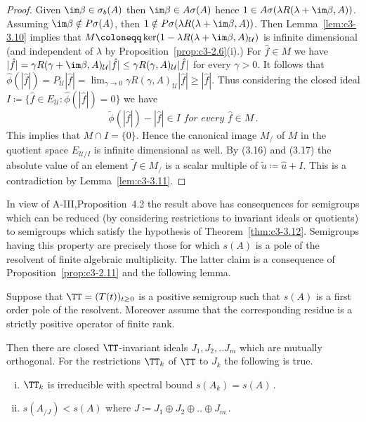 \begin{proof}
	Given $\im\beta \in \sigma_{b}(A)$ then $\im\beta \in A\sigma(A)$ hence $1 \in A\sigma(\lambda R(\lambda+\im\beta,A))$.
	Assuming $\im\beta \notin P\sigma(A)$, then $1 \notin P\sigma(\lambda R(\lambda+\im\beta,A))$.
	Then Lemma~\ref{lem:c3-3.10} implies that $M \coloneqq \ker(1 - \lambda R(\lambda+\im\beta,A)_{\mathcal{U}})$ is infinite dimensional (and independent of $\lambda$ by Proposition~\ref{prop:c3-2.6}(i).)
	For $\hat{f} \in M$ we have $|\hat{f}| = \gamma R(\gamma+\im\beta,A)_{\mathcal{U}}|\hat{f}| \leq \gamma R(\gamma,A)_{\mathcal{U}}|\hat{f}|$ for every $\gamma > 0$.
	It follows that $\hat{\phi}(|\hat{f}|) = P_{\mathcal{U}}|\hat{f}| = \lim_{\gamma\to 0}\gamma R(\gamma,A)_{\mathcal{U}}|\hat{f}| \geq |\hat{f}|$.
	Thus considering the closed ideal $I \coloneqq \{\hat{f} \in E_{\mathcal{U}} \colon \hat{\phi}(|\hat{f}|) = 0\}$ we have
%
%
	\begin{equation}\label{eq:c3-3.17}
		\tilde{\phi}(|\hat{f}|) - |\hat{f}| \in I \textit{ for every } \hat{f} \in M\,.
	\end{equation}
	This implies that $M \cap I = \{0\}$. 
	Hence the canonical image $M_/$ of $M$ in the quotient space $E_{\mathcal{U}/{I}}$ is infinite dimensional as well. 
	By (3.16) and (3.17) the absolute value of an element $\tilde{f} \in M_/$ is a scalar multiple of $\tilde{u} \coloneqq \hat{u} + I$. 
	This is a contradiction by Lemma~\ref{lem:c3-3.11}.
\end{proof}

In view of A-III,Proposition~4.2 the result above has consequences for semigroups which can be reduced (by considering restrictions to invariant ideals or quotients) to semigroups which satisfy the hypothesis of Theorem~\ref{thm:c3-3.12}. 
Semigroups having this property are precisely those for which $s(A)$ is a pole of the resolvent of finite algebraic multiplicity. 
The latter claim is a consequence of Proposition~\ref{prop:c3-2.11} and the following lemma.

\begin{lemma}\label{lem:c3-3.13}
	Suppose that $\TT = (T(t))_{t \ge 0}$ is a positive semigroup such that $s(A)$ is a first order pole of the resolvent. 
	Moreover assume that the corresponding residue is a strictly positive operator of finite rank.
	
	Then there are closed $\TT$-invariant ideals $J_{1},J_{2}, .. J_{m}$ which are mutually orthogonal. 
	For the restrictions  $\TT_{k}$ of $\TT$ to $J_{k}$ the following is true.
	\begin{enumerate}[(i)]
		\item $\TT_{k}$ is irreducible with spectral bound $s(A_k) = s(A)$\,.
		\item $s(A_{/J}) < s(A)$  where $J \coloneqq  J_{1}\oplus J_{2}\oplus .. \oplus J_{m}\,.$
	\end{enumerate}
\end{lemma}

